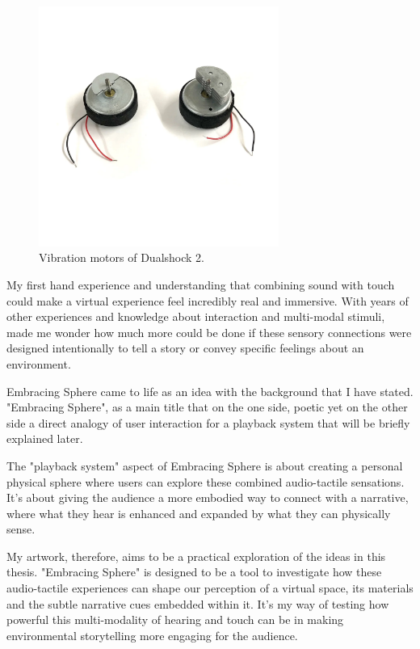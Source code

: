         \begin{figure}[H]
        \centering
        \includegraphics[width=0.7\textwidth]{images/vibration_motors_ds2}
        \caption{Vibration motors of Dualshock 2.}
        \label{fig:Vib_Motors}
        \end{figure}

        My first hand experience and understanding that combining sound with touch could make a virtual experience feel incredibly real and immersive. With years of other experiences and knowledge about interaction and multi-modal stimuli, made me wonder how much more could be done if these sensory connections were designed intentionally to tell a story or convey specific feelings about an environment.\par

        Embracing Sphere came to life as an idea with the background that I have stated. "Embracing Sphere", as a main title that on the one side, poetic yet on the other side a direct analogy of user interaction for a playback system that will be briefly explained later.\par
        
        The "playback system" aspect of Embracing Sphere is about creating a personal physical sphere where users can explore these combined audio-tactile sensations. It's about giving the audience a more embodied way to connect with a narrative, where what they hear is enhanced and expanded by what they can physically sense.\par
        
        My artwork, therefore, aims to be a practical exploration of the ideas in this thesis. "Embracing Sphere" is designed to be a tool to investigate how these audio-tactile experiences can shape our perception of a virtual space, its materials and the subtle narrative cues embedded within it. It’s my way of testing how powerful this multi-modality of hearing and touch can be in making environmental storytelling more engaging for the audience.\par

